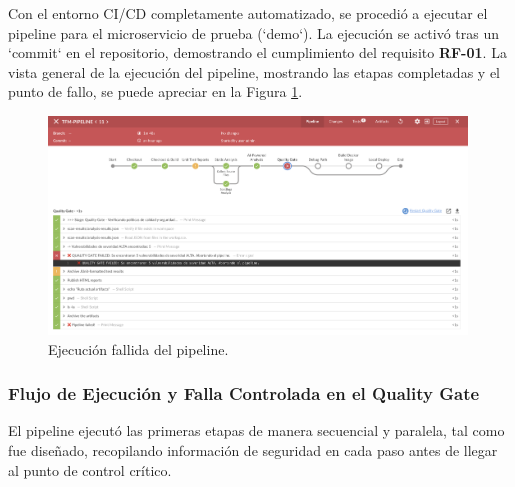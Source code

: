 Con el entorno CI/CD completamente automatizado, se procedió a ejecutar el pipeline para el microservicio de prueba (`demo`). La ejecución se activó tras un `commit` en el repositorio, demostrando el cumplimiento del requisito \textbf{RF-01}. La vista general de la ejecución del pipeline, mostrando las etapas completadas y el punto de fallo, se puede apreciar en la Figura \ref{fig:pipeline_general_fail}.

\begin{figure}[h]
\centering
\includegraphics[width=0.99\textwidth]{contenido/imagenes/4_pipeline_fail.png}
\caption{Ejecución fallida del pipeline.}
\label{fig:pipeline_general_fail}
\end{figure}

\subsubsection{Flujo de Ejecución y Falla Controlada en el Quality Gate}
El pipeline ejecutó las primeras etapas de manera secuencial y paralela, tal como fue diseñado, recopilando información de seguridad en cada paso antes de llegar al punto de control crítico.

